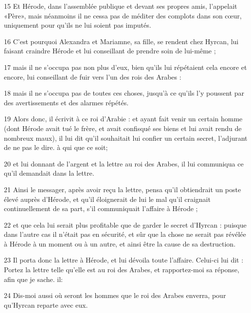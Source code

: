 \par 15 Et Hérode, dans l'assemblée publique et devant ses propres amis, l'appelait «Père», mais néanmoins il ne cessa pas de méditer des complots dans son cœur, uniquement pour qu'ils ne lui soient pas imputés.

\par 16 C'est pourquoi Alexandra et Mariamne, sa fille, se rendent chez Hyrcan, lui faisant craindre Hérode et lui conseillant de prendre soin de lui-même ;

\par 17 mais il ne s'occupa pas non plus d'eux, bien qu'ils lui répétaient cela encore et encore, lui conseillant de fuir vers l'un des rois des Arabes :

\par 18 mais il ne s'occupa pas de toutes ces choses, jusqu'à ce qu'ils l'y poussent par des avertissements et des alarmes répétés.

\par 19 Alors donc, il écrivit à ce roi d'Arabie : et ayant fait venir un certain homme (dont Hérode avait tué le frère, et avait confisqué ses biens et lui avait rendu de nombreux maux), il lui dit qu'il souhaitait lui confier un certain secret, l'adjurant de ne pas le dire. à qui que ce soit;

\par 20 et lui donnant de l'argent et la lettre au roi des Arabes, il lui communiqua ce qu'il demandait dans la lettre.

\par 21 Ainsi le messager, après avoir reçu la lettre, pensa qu'il obtiendrait un poste élevé auprès d'Hérode, et qu'il éloignerait de lui le mal qu'il craignait continuellement de sa part, s'il communiquait l'affaire à Hérode ;

\par 22 et que cela lui serait plus profitable que de garder le secret d'Hyrcan : puisque dans l'autre cas il n'était pas en sécurité, et sûr que la chose ne serait pas révélée à Hérode à un moment ou à un autre, et ainsi être la cause de sa destruction.

\par 23 Il porta donc la lettre à Hérode, et lui dévoila toute l'affaire. Celui-ci lui dit : Portez la lettre telle qu'elle est au roi des Arabes, et rapportez-moi sa réponse, afin que je sache. il:

\par 24 Dis-moi aussi où seront les hommes que le roi des Arabes enverra, pour qu'Hyrcan reparte avec eux.

